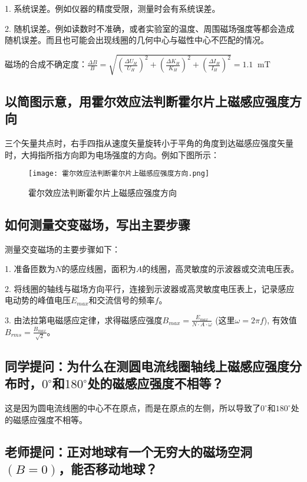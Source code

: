 \documentclass[11pt]{article}
\newcommand*{\unit}[1]{\mathop{}\!\mathrm{#1}}
\begin{document}
1. 系统误差。例如仪器的精度受限，测量时会有系统误差。

2. 随机误差。例如读数时不准确，或者实验室的温度、周围磁场强度等都会造成随机误差。而且也可能会出现线圈的几何中心与磁性中心不匹配的情况。

磁场的合成不确定度：$\displaystyle \frac{\Delta B}{B} = \sqrt{\left(\frac{\Delta U_H}{U_H}\right)^2 + \left(\frac{\Delta K_H}{K_H}\right)^2 + \left(\frac{\Delta I_H}{I_H}\right)^2} = 1.1 \unit{mT}$

\subsection{以简图示意，用霍尔效应法判断霍尔片上磁感应强度方向}

三个矢量共点时，右手四指从速度矢量旋转小于平角的角度到达磁感应强度矢量时，大拇指所指方向即为电场强度的方向。例如下图所示：

\begin{figure}[H]
  \centering
  \texttt{[image: 霍尔效应法判断霍尔片上磁感应强度方向.png]}
  \caption{霍尔效应法判断霍尔片上磁感应强度方向}
\end{figure}

\subsection{如何测量交变磁场，写出主要步骤}

测量交变磁场的主要步骤如下：

1. 准备匝数为$N$的感应线圈，面积为$A$的线圈，高灵敏度的示波器或交流电压表。

2. 将线圈的轴线与磁场方向平行，连接到示波器或高灵敏度电压表上，记录感应电动势的峰值电压$E_{max}$和交流信号的频率$f$。

3. 由法拉第电磁感应定律，求得磁感应强度$B_{max} = \frac{E_{max}}{N \cdot A \cdot \omega}$ (这里$\omega = 2 \pi f$), 有效值$B_{rms} = \frac{B_{max}}{\sqrt{2}}$。

\subsection{同学提问：为什么在测圆电流线圈轴线上磁感应强度分布时，$0^ {\circ}$和$180^{\circ}$处的磁感应强度不相等？}

这是因为圆电流线圈的中心不在原点，而是在原点的左侧，所以导致了$0^{\circ}$和$180^{\circ}$处的磁感应强度不相等。

\subsection{老师提问：正对地球有一个无穷大的磁场空洞$(B = 0)$，能否移动地球？}
\end{document}
